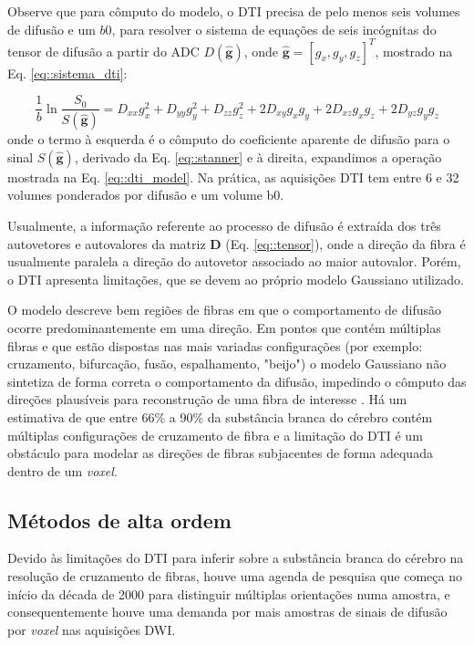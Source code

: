 \documentclass[
    12pt,                %
    oneside,            %
    a4paper,            %
    english,            %
    french,                %
    spanish,            %
    brazil                %
    ]{abntex2}
\begin{document}
Observe que para cômputo do modelo, o DTI precisa de pelo menos seis volumes de difusão e um $b0$, para resolver o sistema de equações de seis incógnitas do tensor de difusão a partir do ADC $D(\mathbf{\hat{g}})$, onde $\mathbf{\hat{g}} = [g_x, g_y, g_z]^T$, mostrado na Eq. \ref{eq::sistema_dti}:

\begin{equation}
\label{eq::sistema_dti}
\frac{1}{b}\ln{\frac{S_0}{S(\mathbf{\hat{g}})}}=D_{x x} g_{x}^{2} +D_{y y} g_{y}^{2}+D_{z z} g_{z}^{2}+2 D_{x y} g_{x} g_{y} +2 D_{x z} g_{x} g_{z}+2 D_{y z} g_{y} g_{z}
\end{equation}
onde o termo à esquerda é o cômputo do coeficiente aparente de difusão para o sinal $S(\mathbf{\hat{g}})$, derivado da Eq. \ref{eq::stanner} e à direita, expandimos a operação mostrada na Eq. \ref{eq::dti_model}. Na prática, as aquisições DTI tem entre 6 e 32 volumes ponderados por difusão e um volume b0. 

Usualmente, a informação referente ao processo de difusão é extraída dos três autovetores e autovalores da matriz $\mathbf{D}$ (Eq. \ref{eq::tensor}), onde a direção da fibra é usualmente paralela a direção do autovetor associado ao maior autovalor.
Porém, o DTI apresenta limitações, que se devem ao próprio modelo Gaussiano utilizado.

O modelo descreve bem regiões de fibras em que o comportamento de difusão ocorre predominantemente em uma direção. Em pontos que contém múltiplas fibras e que estão dispostas nas mais variadas configurações (por exemplo: cruzamento, bifurcação, fusão, espalhamento, "beijo") o modelo Gaussiano não sintetiza de forma correta o comportamento da difusão, impedindo o cômputo das direções plausíveis para reconstrução de uma fibra de interesse \cite{fillard2011, daducci2014}. Há um estimativa de que entre 66\% a 90\% da substância branca do cérebro contém múltiplas configurações de cruzamento de fibra \cite{descoteaux2015} e a limitação do DTI é um obstáculo para modelar as direções de fibras subjacentes de forma adequada dentro de um \textit{voxel}.

\subsection{Métodos de alta ordem}
\label{metodos_de_alta_ordem}

Devido às limitações do DTI para inferir sobre a substância branca do cérebro na resolução de cruzamento de fibras, houve uma agenda de pesquisa que começa no início da década de 2000 para distinguir múltiplas orientações numa amostra, e consequentemente houve uma demanda por mais amostras de sinais de difusão por \textit{voxel} nas aquisições DWI. %
\end{document}
